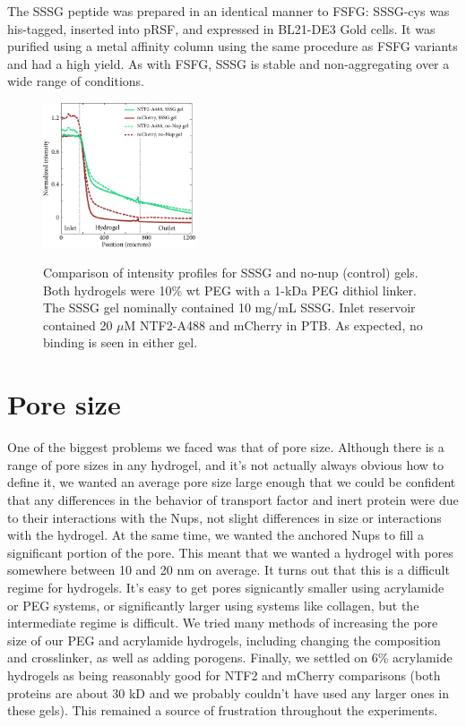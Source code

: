The SSSG peptide was prepared in an identical manner to FSFG: SSSG-cys was his-tagged, inserted into pRSF, and expressed in BL21-DE3 Gold cells.  It was purified using a metal  affinity column using the same procedure as FSFG variants and had a high yield.  As with FSFG, SSSG is stable and non-aggregating over a wide range of conditions.
\begin{figure} %
\caption{Comparison of intensity profiles for SSSG and no-nup (control) gels. Both hydrogels were 10\% wt PEG with a 1-kDa PEG dithiol linker.  The SSSG gel nominally contained 10 mg/mL SSSG.  Inlet reservoir contained 20 $\mu$M NTF2-A488 and mCherry in PTB.  As expected, no binding is seen in either gel.\\}
\centering
\includegraphics[width=0.4\textwidth]{figs/ch03/SSSG-control-comparison}
\label{fig:SSSG-control-comparison}
\end{figure} 

\section{Pore size}

One of the biggest problems we faced was that of pore size.  Although there is a range of pore sizes in any hydrogel, and it's not actually always obvious how to define it, we wanted an average pore size large enough that we could be confident that any differences in the behavior of transport factor and inert protein were due to their interactions with the Nups, not slight differences in size or interactions with the hydrogel.  At the same time, we wanted the anchored Nups to fill a significant portion of the pore.  This meant that we wanted a hydrogel with pores somewhere between 10 and 20 nm on average.  It turns out that this is a difficult regime for hydrogels.  It's easy to get pores signicantly smaller using acrylamide or PEG systems, or significantly larger using systems like collagen, but the intermediate regime is difficult.  We tried many methods of increasing the pore size of our PEG and acrylamide hydrogels, including changing the composition and crosslinker, as well as adding porogens.  Finally, we settled on 6\% acrylamide hydrogels as being reasonably good for NTF2 and mCherry comparisons (both proteins are about 30 kD and we probably couldn't have used any larger ones in these gels).  This remained a source of frustration throughout the experiments.

